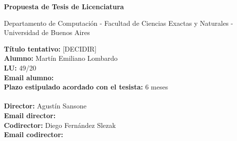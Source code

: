 \begin{titlepage}
\begin{center}

\vspace*{0.5cm}

\huge\bfseries
Propuesta de Tesis de Licenciatura

\vspace*{0.5cm}

\large Departamento de Computación - Facultad de Ciencias Exactas y Naturales - Universidad de Buenos Aires

\end{center}

\vspace*{0.5cm}

\noindent
\textbf{Título tentativo:} [DECIDIR] \\
\textbf{Alumno:} Martín Emiliano Lombardo \\
\textbf{LU:} 49/20 \\
\textbf{Email alumno:} \href{mailto:mlombardo9@gmail.com}{} \\
\textbf{Plazo estipulado acordado con el tesista:} 6 meses
\\\\
\textbf{Director:} Agustín Sansone \\
\textbf{Email director:} \href{mailto:agustinsansone7@gmail.com}{} \\
\textbf{Codirector:} Diego Fernández Slezak \\
\textbf{Email codirector:} \href{mailto:dfslezak@dc.uba.ar}{} \\

\vspace*{\fill}
\end{titlepage}
